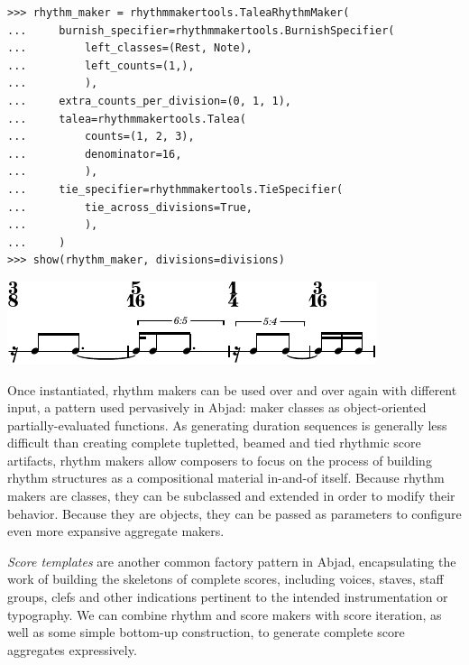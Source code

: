 \documentclass{article}
\begin{document}
\begin{lstlisting}
>>> rhythm_maker = rhythmmakertools.TaleaRhythmMaker(
...     burnish_specifier=rhythmmakertools.BurnishSpecifier(
...         left_classes=(Rest, Note),
...         left_counts=(1,),
...         ),
...     extra_counts_per_division=(0, 1, 1),
...     talea=rhythmmakertools.Talea(
...         counts=(1, 2, 3),
...         denominator=16,
...         ),
...     tie_specifier=rhythmmakertools.TieSpecifier(
...         tie_across_divisions=True,
...         ),
...     )
>>> show(rhythm_maker, divisions=divisions)
\end{lstlisting}
\includegraphics{assets/lilypond-cf8687c5463d3d6aec12827476c8fc4e.pdf}

Once instantiated, rhythm makers can be used over and over again with different
input, a pattern used pervasively in Abjad: maker classes as object-oriented
partially-evaluated functions. As generating duration sequences is generally
less difficult than creating complete tupletted, beamed and tied rhythmic score
artifacts, rhythm makers allow composers to focus on the process of building
rhythm structures as a compositional material in-and-of itself. Because rhythm
makers are classes, they can be subclassed and extended in order to modify
their behavior. Because they are objects, they can be passed as parameters to
configure even more expansive aggregate makers.

\emph{Score templates} are another common factory pattern in Abjad,
encapsulating the work of building the skeletons of complete scores, including
voices, staves, staff groups, clefs and other indications pertinent to the
intended instrumentation or typography. We can combine rhythm and score makers
with score iteration, as well as some simple bottom-up construction, to
generate complete score aggregates expressively.

\end{document}
